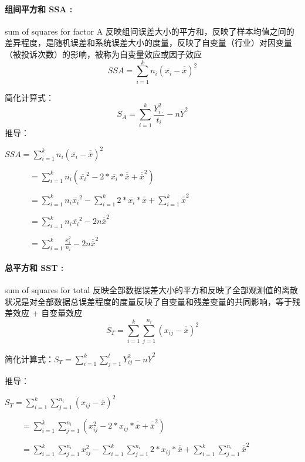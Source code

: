 \documentclass[UTF8,10pt]{book}
\begin{document}
{    \paragraph{组间平方和 SSA :} sum of squares for factor A	反映组间误差大小的平方和，反映了样本均值之间的差异程度，是随机误差和系统误差大小的度量，反映了自变量（行业）对因变量（被投诉次数）的影响，被称为自变量效应或因子效应$$ SSA = \sum_{i=1}^k n_i \left(\overline{x_i} - \overline{\overline{x}} \right)^2 $$ 
    
    简化计算式：
    $$ S_A = \sum_{i=1}^k \frac{Y_{i \cdot}^2}{t_i} -n\overline{Y}^2 $$ 
    推导： 
    
    $ SSA = \sum_{i=1}^k n_i \left(\overline{x_i} - \overline{\overline{x}} \right)^2 $ 
    
    $\quad \quad \quad = \sum_{i=1}^k n_i \left( \overline{x_i}^2 -2*\overline{x_i} * \overline{\overline{x}} + \overline{\overline{x}}^2 \right) $ 
    
    $\quad \quad \quad = \sum_{i=1}^k n_i \overline{x_i}^2 - \sum_{i=1}^k 2*\overline{x_i} * \overline{\overline{x}} +\sum_{i=1}^k \overline{\overline{x}}^2$ 
    
    $\quad \quad \quad = \sum_{i=1}^k n_i \overline{x_i}^2 - 2n\overline{\overline{x}}^2$ 
    
    $\quad \quad \quad = \sum_{i=1}^k \frac{ x_i^2}{n_i} - 2n\overline{\overline{x}}^2 $

    \paragraph{总平方和 SST :} sum of squares for total	反映全部数据误差大小的平方和反映了全部观测值的离散状况是对全部数据总误差程度的度量反映了自变量和残差变量的共同影响，等于残差效应 + 自变量效应$$ S_T = \sum_{i=1}^k \sum_{j=1}^{n_i} \left(x_{ij} - \overline{\overline{x}} \right)^2 $$ 
    
    简化计算式：$ S_T = \sum_{i=1}^k \sum_{j=1}^{t} Y_{ij}^2 - n \overline{Y}^2 $ 
    
    推导： 
    
    $ S_T = \sum_{i=1}^k \sum_{j=1}^{n_i} \left(x_{ij} - \overline{\overline{x}} \right)^2 $ 
    
    $ \quad \quad = \sum_{i=1}^k \sum_{j=1}^{n_i} \left( x_{ij}^2 - 2*x_{ij}* \overline{\overline{x}} + \overline{\overline{x}}^2 \right)$ 
    
    $ \quad \quad = \sum_{i=1}^k \sum_{j=1}^{n_i} x_{ij}^2 -\sum_{i=1}^k \sum_{j=1}^{n_i} 2*x_{ij}* \overline{\overline{x}} + \sum_{i=1}^k \sum_{j=1}^{n_i} \overline{\overline{x}}^2 $ 
    
}
\end{document}
